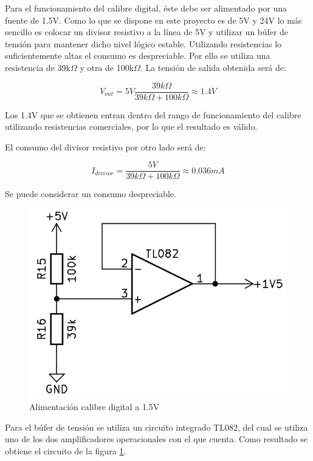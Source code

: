 Para el funcionamiento del calibre digital, éste debe ser alimentado por una fuente de 1.5V. Como lo que se
dispone en este proyecto es de 5V y 24V lo más sencillo es colocar un divisor resistivo a la línea de 5V y
utilizar un búfer de tensión para mantener dicho nivel lógico estable. Utilizando resistencias lo suficientemente
altas el consumo es despreciable. Por ello se utiliza una resistencia de 39k$\Omega$ y otra de 100k$\Omega$. La 
tensión de salida obtenida será de:

\begin{equation}
    V_{out} = 5V \frac{39k\Omega}{39k\Omega+100k\Omega} \approx 1.4V
\end{equation}

Los 1.4V que se obtienen entran dentro del rango de funcionamiento del calibre utilizando resistencias comerciales,
por lo que el resultado es válido. 

El consumo del divisor resistivo por otro lado será de:

\begin{equation}
    I_{divisor} = \frac{5V}{39k\Omega+100k\Omega} \approx 0.036 mA
\end{equation}

Se puede considerar un consumo despreciable.

\begin{figure}[hbtp]
    \centering
    \includegraphics[width=\textwidth/2]{03-placa/04-alimentacion-calibre.png}
    \caption{Alimentación calibre digital a 1.5V}
    \label{fig:alimcal}
\end{figure}

Para el búfer de tensión se utiliza un circuito integrado TL082, del cual se utiliza uno de los dos amplificadores
operacionales con el que cuenta. Como resultado se obtiene el circuito de la figura \ref{fig:alimcal}.

